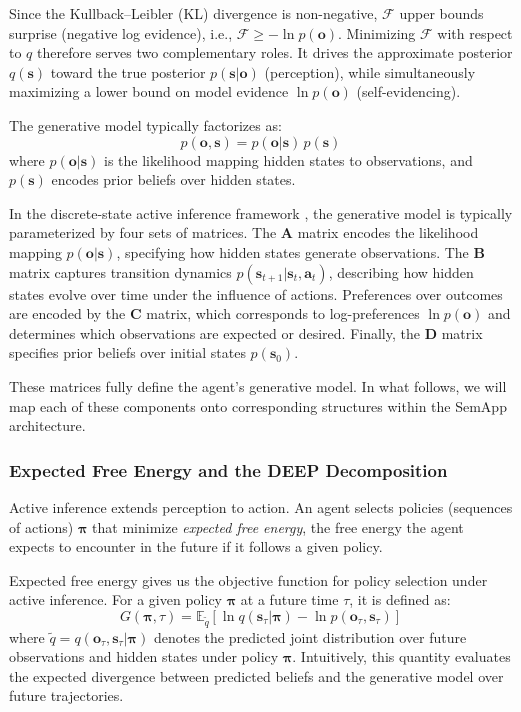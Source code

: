 \documentclass[11pt,a4paper]{article}
\theoremstyle{definition}
\newcommand{\E}{\mathbb{E}}
\newcommand{\bq}{q}
\newcommand{\bp}{p}
\newcommand{\bo}{\bm{o}}
\newcommand{\bs}{\bm{s}}
\newcommand{\ba}{\bm{a}}
\newcommand{\bpi}{\bm{\pi}}
\begin{document}
Since the Kullback–Leibler (KL) divergence is non-negative, $\mathcal{F}$ upper bounds surprise (negative log evidence), i.e., $\mathcal{F} \geq -\ln \bp(\bo)$. Minimizing $\mathcal{F}$ with respect to $\bq$ therefore serves two complementary roles. It drives the approximate posterior $\bq(\bs)$ toward the true posterior $\bp(\bs|\bo)$ (perception), while simultaneously maximizing a lower bound on model evidence $\ln \bp(\bo)$ (self-evidencing).

The generative model typically factorizes as:
\begin{equation}
\label{eq:gm}
\bp(\bo, \bs) = \bp(\bo|\bs)\,\bp(\bs)
\end{equation}
where $\bp(\bo|\bs)$ is the likelihood mapping hidden states to observations, and $\bp(\bs)$ encodes prior beliefs over hidden states.

In the discrete-state active inference framework \citep{parr2022active}, the generative model is typically parameterized by four sets of matrices. The $\mathbf{A}$ matrix encodes the likelihood mapping $\bp(\bo|\bs)$, specifying how hidden states generate observations. The $\mathbf{B}$ matrix captures transition dynamics $\bp(\bs_{t+1}|\bs_t, \ba_t)$, describing how hidden states evolve over time under the influence of actions. Preferences over outcomes are encoded by the $\mathbf{C}$ matrix, which corresponds to log-preferences $\ln \bp(\bo)$ and determines which observations are expected or desired. Finally, the $\mathbf{D}$ matrix specifies prior beliefs over initial states $\bp(\bs_0)$.

These matrices fully define the agent’s generative model. In what follows, we will map each of these components onto corresponding structures within the SemApp architecture.

\subsubsection{Expected Free Energy and the DEEP Decomposition}
\label{sec:efe}

Active inference extends perception to action. An agent selects policies (sequences of actions) $\bpi$ that minimize \emph{expected free energy}, the free energy the agent expects to encounter in the future if it follows a given policy.

Expected free energy gives us the objective function for policy selection under active inference. For a given policy $\bpi$ at a future time $\tau$, it is defined as:
\begin{equation}
\label{eq:efe}
G(\bpi, \tau) = \E_{\tilde{\bq}}\!\left[\ln \bq(\bs_\tau | \bpi) - \ln \bp(\bo_\tau, \bs_\tau)\right]
\end{equation}
where $\tilde{\bq} = \bq(\bo_\tau, \bs_\tau | \bpi)$ denotes the predicted joint distribution over future observations and hidden states under policy $\bpi$. Intuitively, this quantity evaluates the expected divergence between predicted beliefs and the generative model over future trajectories.
\end{document}
